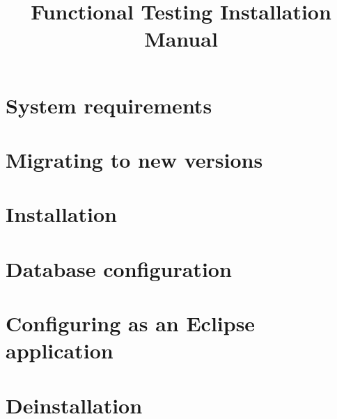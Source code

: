
%
\title{Functional Testing Installation Manual}
\author*{}{}
\maketitle


\tableofcontents
\renewcommand{\bxcomment}[2]{}%
\clearpage
\setcounter{secnumdepth}{2}%

\chapter{System requirements}

\clearpage
\chapter{Migrating to new versions}
\label{Migrate}

\clearpage
\chapter{Installation}

\clearpage
\chapter{Database configuration}

\clearpage
\chapter{Configuring as an Eclipse application}

\clearpage
\chapter{Deinstallation}

